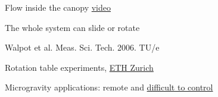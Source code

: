 \begin{frame}[label=app-19]{Flow inside the canopy \href{https://www.dropbox.com/s/9x43i2uk9q38fho/flow_inside_laser.mp4?raw=1}{video}}
    \centering
\end{frame}
    

\begin{frame}[label=app-12]{The whole system can slide or rotate}
    \begin{cardTiny} 
        Walpot et al. Meas. Sci. Tech. 2006. TU/e
    \end{cardTiny}
\end{frame}
    

\begin{frame}[label=app-6]{Rotation table experiments, \href{https://www.dropbox.com/s/933wsb9xdahbyi9/rotation.mp4?raw=1}{ETH Zurich}}
\end{frame}
    
  
\begin{frame}[label=app-7]{Microgravity applications: remote and \href{https://www.dropbox.com/s/59ophf177gcfjzq/boiling_microgravity.mp4?raw=1}{difficult to control}}   
    \centering
        
\end{frame}


